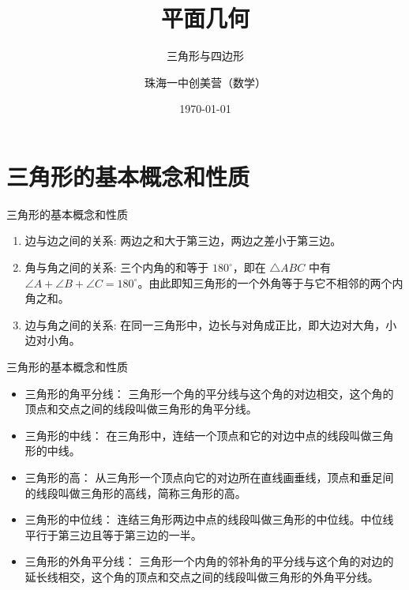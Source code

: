 \documentclass[aspectratio=169]{ctexbeamer}
\title[三角形与四边形]{平面几何}
\subtitle{三角形与四边形}
\author[珠海一中创美营]{珠海一中创美营（数学）}
\date[\today]{\today}
\theoremstyle{definition}
\begin{document}
\frame{\titlepage}
\section{三角形的基本概念和性质}
\begin{frame}{三角形的基本概念和性质}
	\begin{enumerate}
		\item 边与边之间的关系: 两边之和大于第三边，两边之差小于第三边。
		\item 角与角之间的关系: 三个内角的和等于 $180^{\circ}$，即在 $\triangle A B C$ 中有 $\angle A+\angle B+\angle C=180^{\circ}$。由此即知三角形的一个外角等于与它不相邻的两个内角之和。
		\item 边与角之间的关系: 在同一三角形中，边长与对角成正比，即大边对大角，小边对小角。
	\end{enumerate}
\end{frame}

\begin{frame}{三角形的基本概念和性质}
	\begin{itemize}
		\item {\color{blue!50!black}三角形的角平分线：} 三角形一个角的平分线与这个角的对边相交，这个角的顶点和交点之间的线段叫做三角形的角平分线。
		\item {\color{blue!50!black}三角形的中线：} 在三角形中，连结一个顶点和它的对边中点的线段叫做三角形的中线。
		\item {\color{blue!50!black}三角形的高：} 从三角形一个顶点向它的对边所在直线画垂线，顶点和垂足间的线段叫做三角形的高线，简称三角形的高。
		\item {\color{blue!50!black}三角形的中位线：} 连结三角形两边中点的线段叫做三角形的中位线。中位线平行于第三边且等于第三边的一半。
		\item {\color{blue!50!black}三角形的外角平分线：} 三角形一个内角的邻补角的平分线与这个角的对边的延长线相交，这个角的顶点和交点之间的线段叫做三角形的外角平分线。
	\end{itemize}
\end{frame}
\end{document}
